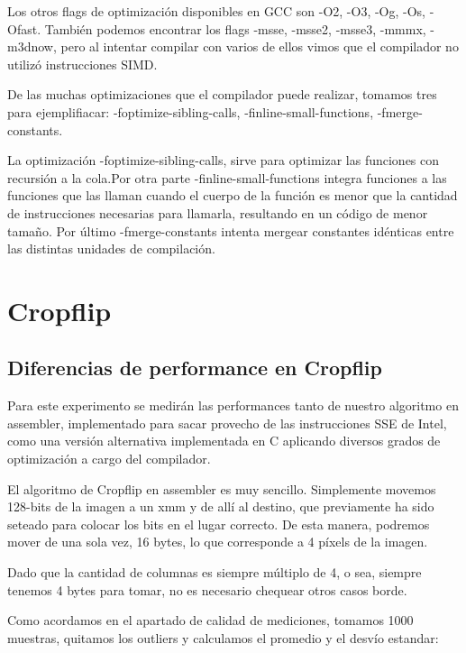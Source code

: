 \documentclass[a4paper]{article}
\begin{document}
Los otros flags de optimización disponibles en GCC son -O2, -O3, -Og, -Os, -Ofast. También podemos encontrar los flags -msse, -msse2, -msse3, -mmmx, -m3dnow, pero al intentar compilar con varios de ellos vimos que el compilador no utilizó instrucciones SIMD.

De las muchas optimizaciones que el compilador puede realizar, tomamos tres para ejemplifiacar: -foptimize-sibling-calls, -finline-small-functions, -fmerge-constants.

La optimización -foptimize-sibling-calls, sirve para optimizar las funciones con recursión a la cola.Por otra parte -finline-small-functions integra funciones a las funciones que las llaman cuando el cuerpo de la función es menor que la cantidad de instrucciones necesarias para llamarla, resultando en un código de menor tamaño. Por último -fmerge-constants intenta mergear constantes idénticas entre las distintas unidades de compilación.

\newpage

\section{Cropflip}

\subsection{Diferencias de performance en Cropflip}
Para este experimento se medirán las performances tanto de nuestro algoritmo en assembler, implementado para sacar provecho de las instrucciones SSE de Intel, como una versión alternativa implementada en C aplicando diversos grados de optimización a cargo del compilador.

El algoritmo de Cropflip en assembler es muy sencillo. Simplemente movemos 128-bits de la imagen a un xmm y de allí al destino, que previamente ha sido seteado para colocar los bits en el lugar correcto. De esta manera, podremos mover de una sola vez, 16 bytes, lo que corresponde a 4 píxels de la imagen.

Dado que la cantidad de columnas es siempre múltiplo de 4, o sea, siempre tenemos 4 bytes para tomar, no es necesario chequear otros casos borde.

Como acordamos en el apartado de calidad de mediciones, tomamos 1000 muestras, quitamos los outliers y calculamos el promedio y el desvío estandar:
\end{document}
